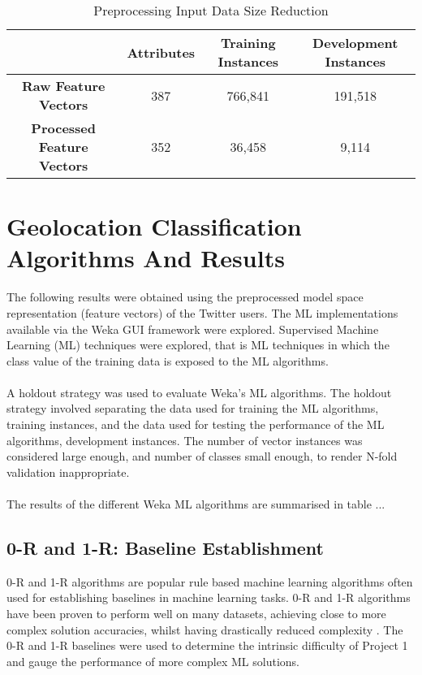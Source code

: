 \documentclass[11pt]{article}
\begin{document}
\begin{table} [th]
\caption{Preprocessing Input Data Size Reduction}
\centering
	\begin{tabular}{| c | c | c | c |}
	\hline
	 & \textbf{Attributes} & \textbf{Training Instances} & \textbf{Development Instances}  \\
	\hline
	\textbf{Raw Feature Vectors} & 387 & 766,841 & 191,518\\
	\hline
	\textbf{Processed Feature Vectors} & 352 & 36,458 & 9,114\\
	\hline
	\end{tabular}
\label{table:input-table}
\end{table}

\section{Geolocation Classification Algorithms And Results}

The following results were obtained using the preprocessed model space representation (feature vectors) of the Twitter users. The ML implementations available via the Weka GUI framework were explored. Supervised Machine Learning (ML) techniques were explored, that is ML techniques in which the class value of the training data is exposed to the ML algorithms.\\\\
A holdout strategy was used to evaluate Weka's ML algorithms. The holdout strategy involved separating the data used for training the ML algorithms, training instances, and the data used for testing the performance of the ML algorithms, development instances. The number of vector instances was considered large enough, and number of classes small enough, to render N-fold validation inappropriate.\\\\
The results of the different Weka ML algorithms are summarised in table ...

\subsection{0-R and 1-R: Baseline Establishment}   

0-R and 1-R algorithms are popular rule based machine learning algorithms often used for establishing baselines in machine learning tasks. 0-R and 1-R algorithms have been proven to perform well on many datasets, achieving close to more complex solution accuracies, whilst having drastically reduced complexity \cite{holte-1R}. The 0-R and 1-R baselines were used to determine the intrinsic difficulty of Project 1 and gauge the performance of more complex ML solutions.
\end{document}
